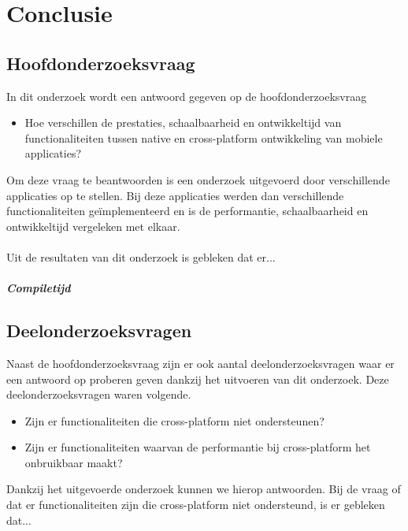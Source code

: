 
\chapter{Conclusie}%
\label{ch:conclusie}


\section{Hoofdonderzoeksvraag}
In dit onderzoek wordt een antwoord gegeven op de hoofdonderzoeksvraag 
\begin{itemize}
    \item Hoe verschillen de prestaties, schaalbaarheid en ontwikkeltijd van functionaliteiten tussen native en cross-platform ontwikkeling van mobiele applicaties?
\end{itemize}
Om deze vraag te beantwoorden is een onderzoek uitgevoerd door verschillende applicaties op te stellen. 
Bij deze applicaties werden dan verschillende functionaliteiten geïmplementeerd en is de performantie, 
schaalbaarheid en ontwikkeltijd vergeleken met elkaar. 
\\\\
Uit de resultaten van dit onderzoek is gebleken dat er...

\paragraph{Compiletijd}


\section{Deelonderzoeksvragen}
Naast de hoofdonderzoeksvraag zijn er ook aantal deelonderzoeksvragen waar er een antwoord op proberen 
geven dankzij het uitvoeren van dit onderzoek. 
Deze deelonderzoeksvragen waren volgende.
\begin{itemize}
    \item Zijn er functionaliteiten die cross-platform niet ondersteunen?
    \item Zijn er functionaliteiten waarvan de performantie bij cross-platform het onbruikbaar maakt?
\end{itemize}
Dankzij het uitgevoerde onderzoek kunnen we hierop antwoorden. Bij de vraag of dat er 
functionaliteiten zijn die cross-platform niet ondersteund, 
is er gebleken dat...

